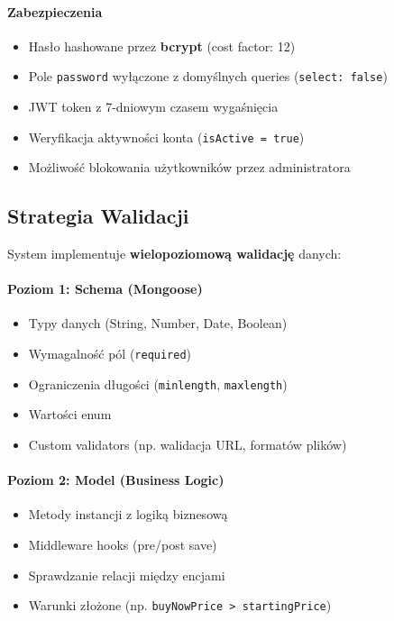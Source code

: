 \paragraph{Zabezpieczenia}

\begin{itemize}
  \item Hasło hashowane przez \textbf{bcrypt} (cost factor: 12)
  \item Pole \texttt{password} wyłączone z domyślnych queries (\texttt{select: false})
  \item JWT token z 7-dniowym czasem wygaśnięcia
  \item Weryfikacja aktywności konta (\texttt{isActive = true})
  \item Możliwość blokowania użytkowników przez administratora
\end{itemize}

\subsection{Strategia Walidacji}

System implementuje \textbf{wielopoziomową walidację} danych:

\paragraph{Poziom 1: Schema (Mongoose)}
\begin{itemize}
  \item Typy danych (String, Number, Date, Boolean)
  \item Wymagalność pól (\texttt{required})
  \item Ograniczenia długości (\texttt{minlength}, \texttt{maxlength})
  \item Wartości enum
  \item Custom validators (np. walidacja URL, formatów plików)
\end{itemize}

\paragraph{Poziom 2: Model (Business Logic)}
\begin{itemize}
  \item Metody instancji z logiką biznesową
  \item Middleware hooks (pre/post save)
  \item Sprawdzanie relacji między encjami
  \item Warunki złożone (np. \texttt{buyNowPrice > startingPrice})
\end{itemize}

